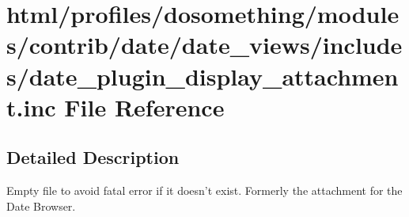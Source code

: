 \hypertarget{date__plugin__display__attachment_8inc}{
\section{html/profiles/dosomething/modules/contrib/date/date\_\-views/includes/date\_\-plugin\_\-display\_\-attachment.inc File Reference}
\label{date__plugin__display__attachment_8inc}
}


\subsection{Detailed Description}
Empty file to avoid fatal error if it doesn't exist. Formerly the attachment for the Date Browser. 